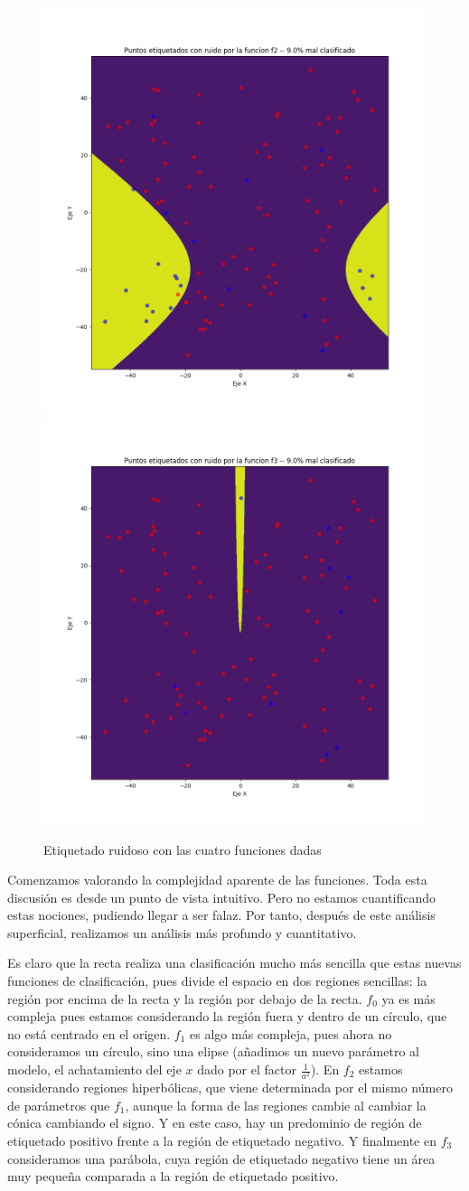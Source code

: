 \documentclass[11pt]{article}
\begin{document}
\begin{figure}[H]
    \includegraphics[width=0.60 \textwidth]{puntos_clasificados_experimento_f2.png}
    \includegraphics[width=0.60 \textwidth]{puntos_clasificados_experimento_f3.png}

    \caption{Etiquetado ruidoso con las cuatro funciones dadas}
\end{figure}

Comenzamos valorando la complejidad aparente de las funciones. Toda esta discusión es desde un punto de vista intuitivo. Pero no estamos cuantificando estas nociones, pudiendo llegar a ser falaz. Por tanto, después de este análisis superficial, realizamos un análisis más profundo y cuantitativo.

Es claro que la recta realiza una clasificación mucho más sencilla que estas nuevas funciones de clasificación, pues divide el espacio en dos regiones sencillas: la región por encima de la recta y la región por debajo de la recta. $f_0$ ya es más compleja pues estamos considerando la región fuera y dentro de un círculo, que no está centrado en el origen. $f_1$ es algo más compleja, pues ahora no consideramos un círculo, sino una elipse (añadimos un nuevo parámetro al modelo, el achatamiento del eje $x$ dado por el factor $\frac{1}{a^2}$). En $f_2$ estamos considerando regiones hiperbólicas, que viene determinada por el mismo número de parámetros que $f_1$, aunque la forma de las regiones cambie al cambiar la cónica cambiando el signo. Y en este caso, hay un predominio de región de etiquetado positivo frente a la región de etiquetado negativo. Y finalmente en $f_3$ consideramos una parábola, cuya región de etiquetado negativo tiene un área muy pequeña comparada a la región de etiquetado positivo.
\end{document}
